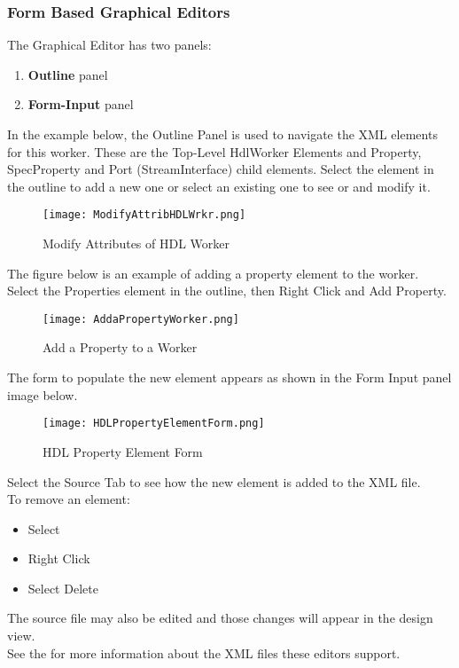 \subsubsection{Form Based Graphical Editors}
The Graphical Editor has two panels:
\begin{enumerate}
\item \textbf{Outline} panel
\item \textbf{Form-Input} panel
\end{enumerate}
In the example below, the Outline Panel is used to navigate the XML elements for this worker. These are the Top-Level HdlWorker Elements and Property, SpecProperty and Port (StreamInterface) child elements. Select the element in the outline to add a new one or select an existing one to see or and modify it.
\begin{figure}[h!]
	\centering
	\caption{Modify Attributes of HDL Worker}\label{fig:ModifyAttributesofHDLWorker}
	\texttt{[image: ModifyAttribHDLWrkr.png]}
 \end{figure}
The figure below is an example of adding a property element to the worker.
Select the Properties element in the outline, then Right Click and Add Property.
\begin{figure}[h!]
	\centering
	\caption{Add a Property to a Worker}\label{fig:AddaPropertyWorker}
	\texttt{[image: AddaPropertyWorker.png]}
 \end{figure}
The form to populate the new element appears as shown in the Form Input panel image below.\\
\begin{figure}[h!]
	\centering
	\caption{HDL Property Element Form}\label{fig:HDLPropertyElementForm}
	\texttt{[image: HDLPropertyElementForm.png]}
 \end{figure}

Select the Source Tab to see how the new element is added to the XML file. \\
To remove an element:
\begin{itemize}
\item Select
\item Right Click
\item Select Delete
\end{itemize}
The source file may also be edited and those changes will appear in the design view.\\

See the  for more information about the XML files these editors support. \\


